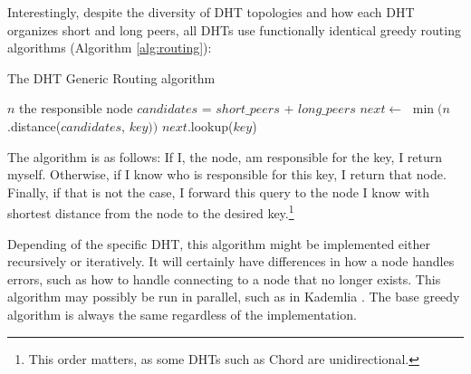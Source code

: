 \documentclass[11pt,conference]{IEEEtran}
\begin{document}
Interestingly, despite the diversity of DHT topologies and how each DHT organizes short and long peers,  all DHTs use functionally identical greedy routing algorithms (Algorithm \ref{alg:routing}):

\begin{algorithm}
	\caption{The DHT Generic Routing algorithm}
	\label{alg:routing}
	\small
	\begin{algorithmic}[1]
				\State \Return $ n $
			\EndIf
				\State \Return the responsible node
			\EndIf
			\State $ candidates $ = $ short\_peers $ + $ long\_peers $
			\State $ next  \leftarrow $  $\min (n$.distance($candidates$, $ key ))$
			\State \Return $next.$lookup($key$)
		\EndFunction
	\end{algorithmic}
	
	\scriptsize
\end{algorithm}
The algorithm is as follows:
If I, the node, am responsible for the key, I return myself.
Otherwise, if I know who is responsible for this key, I return that node.
Finally, if that is not the case, I forward this query to the node I know with shortest distance from the node to the desired key.\footnote{This order matters, as some DHTs such as Chord are unidirectional.} 

Depending of the specific DHT, this algorithm might be implemented either recursively or iteratively.
It will certainly have differences in how a node handles errors, such as how to handle connecting to a node that no longer exists.
This algorithm may possibly be run in parallel, such as in Kademlia \cite{kademlia}.
The base greedy algorithm is always the same regardless of the implementation.
\end{document}
